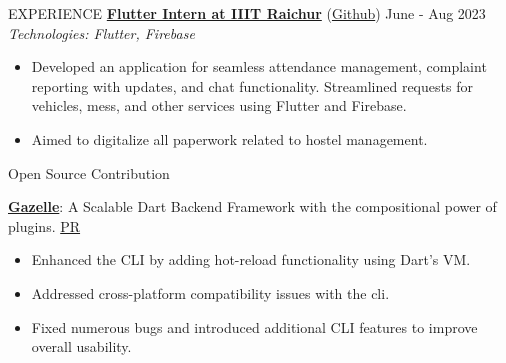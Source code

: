 \documentclass{resume} %
\begin{document}
\begin{rSection}{EXPERIENCE}
    \textbf{\href{https://drive.google.com/file/d/16NqRxg5LFhZu0WkdqG3z83XnLyf5P2UO/view?usp=sharing}{Flutter Intern at IIIT Raichur}} (\href{https://github.com/ShivanshuKGupta/hustle_stay}{Github}) \hfill June - Aug 2023\\
    \textit{Technologies: Flutter, Firebase}
    \begin{itemize}
        \itemsep -3pt {}
        \item Developed an application for seamless attendance management, complaint reporting with updates, and chat functionality. Streamlined requests for vehicles, mess, and other services using Flutter and Firebase.
        \item Aimed to digitalize all paperwork related to hostel management.
    \end{itemize}

\end{rSection}


\begin{rSection}{Open Source Contribution}

    \textbf{\href{https://docs.gazelle-dart.dev/}{Gazelle}}: A Scalable Dart Backend Framework with the compositional power of plugins. \hfill \href{https://github.com/intales/gazelle/commits?author=ShivanshuKGupta}{PR}
    \begin{itemize}
        \item Enhanced the CLI by adding hot-reload functionality using Dart’s VM.
        \item Addressed cross-platform compatibility issues with the cli.
        \item Fixed numerous bugs and introduced additional CLI features to improve overall usability.
    \end{itemize}

\end{rSection}

\end{document}
